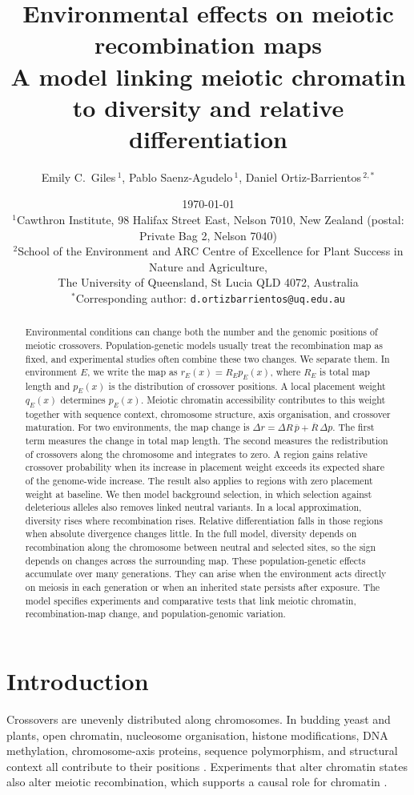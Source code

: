 \documentclass[11pt]{article}
\title{\bfseries Environmental effects on meiotic recombination maps\\[6pt]
{\large\normalfont A model linking meiotic chromatin to diversity and relative differentiation}}
\author{
Emily C.\ Giles\,$^{1}$, \;
Pablo Saenz-Agudelo\,$^{1}$, \;
Daniel Ortiz-Barrientos\,$^{2,\ast}$
}
\date{\today \\[6pt]
\small
$^{1}$Cawthron Institute, 98 Halifax Street East, Nelson 7010,
New Zealand (postal: Private Bag 2, Nelson 7040) \\[1pt]
$^{2}$School of the Environment and ARC Centre of Excellence for Plant Success in
Nature and Agriculture, \\
The University of Queensland, St Lucia QLD 4072, Australia \\[3pt]
\small $^{\ast}$Corresponding author: \texttt{d.ortizbarrientos@uq.edu.au}}
\theoremstyle{remark}
\newcommand{\Rbar}{\overline{R}}
\newcommand{\pbar}{\overline{p}}
\begin{document}
\maketitle

\begin{abstract}
\noindent
Environmental conditions can change both the number and the genomic positions of
meiotic crossovers. Population-genetic models usually treat the recombination map
as fixed, and experimental studies often combine these two changes. We separate
them. In environment $E$, we write the map as $r_E(x)=R_Ep_E(x)$, where $R_E$ is
total map length and $p_E(x)$ is the distribution of crossover positions. A local
placement weight $q_E(x)$ determines $p_E(x)$. Meiotic chromatin accessibility
contributes to this weight together with sequence context, chromosome structure,
axis organisation, and crossover maturation. For two environments, the map change
is $\Delta r=\Delta R\,\pbar+\Rbar\,\Delta p$. The first term measures the change
in total map length. The second measures the redistribution of crossovers along the
chromosome and integrates to zero. A region gains relative crossover probability
when its increase in placement weight exceeds its expected share of the genome-wide
increase. The result also applies to regions with zero placement weight at
baseline. We then model background selection, in which selection against deleterious alleles
also removes linked neutral variants. In a local approximation, diversity rises
where recombination rises. Relative
differentiation falls in those regions when absolute divergence changes little. In
the full model, diversity depends on recombination along the chromosome between
neutral and selected sites, so the sign depends on changes across the surrounding
map. These population-genetic effects accumulate over many generations. They can arise when the environment acts directly on meiosis in each generation
or when an inherited state persists after exposure. The model specifies experiments and comparative tests that link meiotic chromatin,
recombination-map change, and population-genomic variation.
\end{abstract}

\section{Introduction}

Crossovers are unevenly distributed along chromosomes. In budding yeast and
plants, open chromatin, nucleosome organisation, histone modifications, DNA
methylation, chromosome-axis proteins, sequence polymorphism, and structural
context all contribute to their positions
\citep{pan2011,choi2013,choi2018,underwood2018,fernandes2024,son2025}.
Experiments that alter chromatin states also alter meiotic recombination, which
supports a causal role for chromatin
\citep{underwood2018,fernandes2024,son2025,szymanska2026}.
\end{document}

